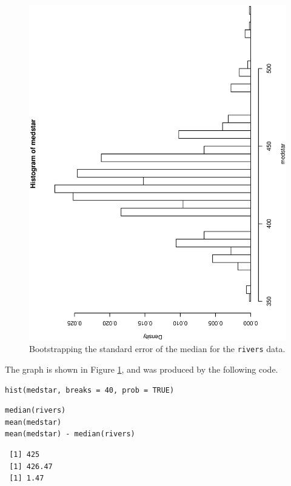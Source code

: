\documentclass[captions=tableheading]{scrbook}
\begin{document}
\begin{example}
\begin{figure}[th]
  \includegraphics[angle=270, totalheight=4in]{ps/resamp/Bootstrapping-se-median.ps}
  \caption[Bootstrapping the standard error of the median for the \texttt{rivers} data]{\small Bootstrapping the standard error of the median for the \texttt{rivers} data.}
  \label{fig-Bootstrapping-se-median}
\end{figure}


The graph is shown in Figure \ref{fig-Bootstrapping-se-median}, and was produced by the following code.


\lstset{language=R}
\begin{lstlisting}
hist(medstar, breaks = 40, prob = TRUE)
\end{lstlisting}


\lstset{language=R}
\begin{lstlisting}
median(rivers)
mean(medstar)
mean(medstar) - median(rivers)
\end{lstlisting}

\begin{verbatim}
 [1] 425
 [1] 426.47
 [1] 1.47
\end{verbatim}

\end{example}
\end{document}
